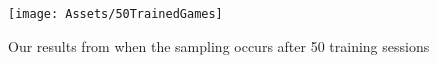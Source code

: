 \begin{figure}[b]
	\centering
	\texttt{[image: Assets/50TrainedGames]}
	\caption{Our results from when the sampling occurs after 50 training sessions}
	\label{fig:50TrainResults}
\end{figure}